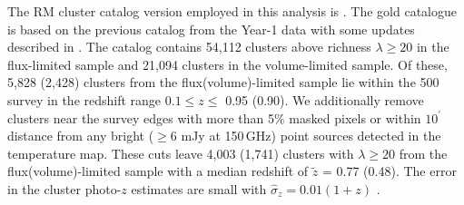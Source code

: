 The RM cluster catalog version employed in this analysis is \whichcatversion. 
The \whichyear{} gold catalogue is based on the previous catalog from the Year-1 data \citep{drlica-wagner17} with some updates described in \citet{morganson18}.
The catalog contains 54,112 clusters above richness $\lambda \ge 20$ in the flux-limited sample and 21,094 clusters in the volume-limited sample. %
Of these, 5,828 (2,428) clusters from the flux(volume)-limited sample lie within the \sptpol{} 500 \sqdeg{} survey  in the redshift range $0.1 \le z \le$ 0.95 (0.90). 
We additionally remove clusters near the survey edges with more than 5\% masked pixels or within $10^{\prime}$ distance from any bright ($\ge 6$ mJy at 150\,GHz) point sources detected in the \sptpol{} temperature map.
These cuts leave 4,003 (1,741) clusters with $\lambda \ge 20$ from the flux(volume)-limited sample with a median redshift of $\tilde{z}$ = 0.77 (0.48). 
The error in the cluster photo-$z$ estimates are small with $\hat{\sigma}_{z} = 0.01 (1+z)$ \citep{rozo15}.

